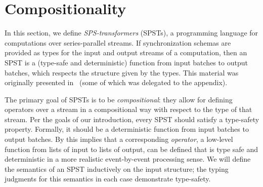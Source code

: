 \chapter{Compositionality}
\label{cha:composition}

In this section, we define \emph{SPS-transformers} (SPSTs), a programming language for computations over series-parallel streams.
If synchronization schemas are provided as types for the input and output streams of a computation,
then an SPST is a (type-safe and deterministic) function from input batches to output batches, which respects the structure given by the types. This material was originally presented in~ (some of which was delegated to the appendix).

The primary goal of SPSTs is to be \emph{compositional}: they allow for defining operators over a stream in a compositional way with respect to the type of that stream.
Per the goals of our introduction, every SPST should satisfy a type-safety property.
Formally, it should be a deterministic function from input batches to output batches.
By  this implies that a corresponding \emph{operator}, a low-level function from lists of input to lists of output, can be defined that is type safe and deterministic
in a more realistic event-by-event processing sense.
We will define the semantics of an SPST inductively on the input structure; the typing judgments for this semantics in each case demonstrate type-safety.


